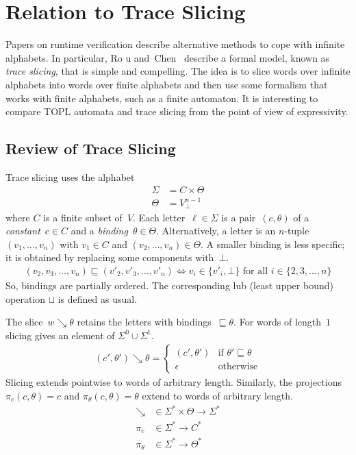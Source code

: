 \documentclass{article} %
\newcommand{\comma}[1]{{\lineskiplimit=0pt \oalign{\relax#1\crcr\hidewidth,\hidewidth}}}
\theoremstyle{definition}
\theoremstyle{remark}
\begin{document}
\section{Relation to Trace Slicing} \label{sec:slicing} %

Papers on runtime verification describe alternative methods to cope with infinite alphabets.
In particular, Ro\comma{s}u and~Chen~\cite{dblp:journals/corr/abs-1112-5761} describe a formal model, known as \emph{trace slicing}, that is simple and compelling.
The idea is to slice words over infinite alphabets into words over finite alphabets and then use some formalism that works with finite alphabets, such as a finite automaton.
It is interesting to compare TOPL automata and trace slicing from the point of view of expressivity.

\subsection{Review of Trace Slicing} \label{sec:review_slicing} %

Trace slicing uses the alphabet
\begin{align*}
\Sigma &= C \times \Theta \\
\Theta &= V_\bot^{n-1}
\end{align*}
where $C$ is a finite subset of~$V$.
Each letter~$\ell\in\Sigma$ is a pair~$(c,\theta)$ of a \emph{constant}~$c\in C$ and a \emph{binding}~$\theta\in\Theta$.
Alternatively, a letter is an $n$-tuple $(v_1,\ldots,v_n)$ with $v_1\in C$ and $(v_2,\ldots,v_n)\in \Theta$.
A smaller binding is less specific; it is obtained by replacing some components with~$\bot$.
\begin{align*}
(v_2,v_3,\ldots,v_n)\sqsubseteq(v'_2,v'_3,\ldots,v'_n) \iff
  \text{$v_i\in\{v'_i,\bot\}$ for all $i\in\{2,3,\ldots,n\}$}
\end{align*}
So, bindings are partially ordered.
The corresponding lub (least upper bound) operation $\sqcup$ is defined as usual.

The slice~$w\searrow\theta$ retains the letters with bindings~$\sqsubseteq\theta$.
For words of length~$1$ slicing gives an element of $\Sigma^0\cup\Sigma^1$.
\begin{align*}
(c',\theta')\searrow\theta=\begin{cases}
  (c',\theta') & \text{if $\theta'\sqsubseteq\theta$} \\
  \epsilon & \text{otherwise}
\end{cases}
\end{align*}
Slicing extends pointwise to words of arbitrary length.
Similarly, the projections $\pi_c(c,\theta)=c$ and $\pi_\theta(c,\theta)=\theta$ extend to words of arbitrary length.
\begin{align*}
  \searrow &\in \Sigma^*\times \Theta \to \Sigma^* \\
  \pi_c &\in \Sigma^*\to C^* \\
  \pi_\theta &\in \Sigma^*\to\Theta^*
\end{align*}
\end{document}
